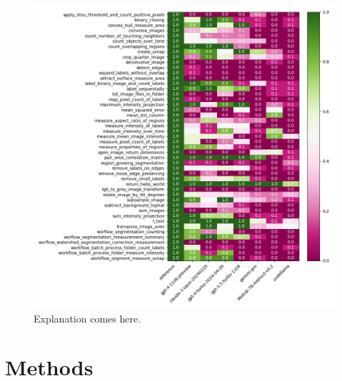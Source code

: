 \documentclass{ecai}
\begin{document}
\begin{figure}[h]
\centering
\includegraphics[width=\textwidth]{../../demo/performance_per_task.png}
\caption{Explanation comes here.}
\label{fig:performancepertask}
\end{figure}


\section{Methods}
\end{document}
